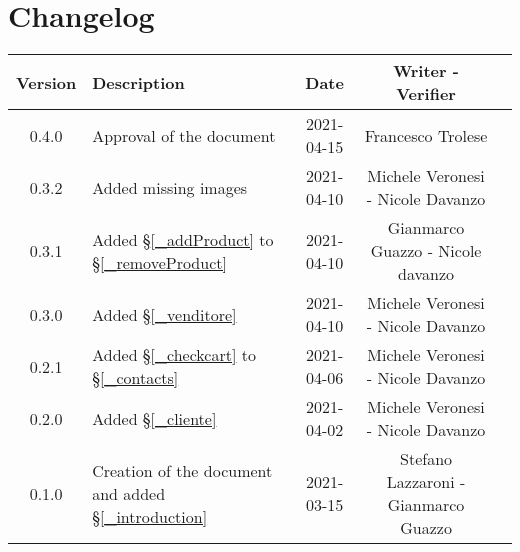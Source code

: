 \section*{Changelog}

\begin{center}
	\begin{longtable}{|c|p{5cm}|c|c|c|}
	\hline
	\rowcolor{lighter-grayer}
	\textbf{Version} & \textbf{Description} & \textbf{Date} & \textbf{Writer - Verifier} \\
	\hline
	\endfirsthead


	\hline
	0.4.0 & Approval of the document & 2021-04-15 & Francesco Trolese\\
	0.3.2 & Added missing images & 2021-04-10 & Michele Veronesi - Nicole Davanzo\\
	0.3.1 & Added \S\ref{_addProduct} to \S\ref{_removeProduct}  & 2021-04-10 & Gianmarco Guazzo - Nicole davanzo\\
	0.3.0 & Added \S\ref{_venditore} & 2021-04-10 & Michele Veronesi - Nicole Davanzo\\
	0.2.1 & Added \S\ref{_checkcart} to \S\ref{_contacts} & 2021-04-06 & Michele Veronesi - Nicole Davanzo\\
	0.2.0 & Added \S\ref{_cliente} & 2021-04-02 & Michele Veronesi - Nicole Davanzo\\
	0.1.0 & Creation of the document and added \S\ref{_introduction}  & 2021-03-15 & Stefano Lazzaroni - Gianmarco Guazzo\\
	\hline

	\end{longtable}
\end{center}